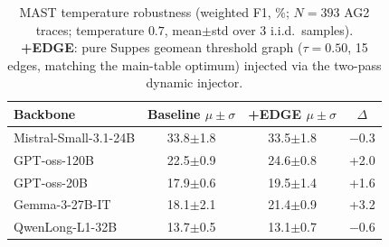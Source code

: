 %
%
%

\begin{table}[!tbp]
\centering \footnotesize
\begin{tabular}{l cc c}
\toprule
\textbf{Backbone} & Baseline $\mu\pm\sigma$ & +EDGE $\mu\pm\sigma$ & $\Delta$ \\
\midrule
Mistral-Small-3.1-24B & 33.8$\pm$1.8 & 33.5$\pm$1.8 & $-$0.3 \\
GPT-oss-120B          & 22.5$\pm$0.9 & 24.6$\pm$0.8 & +2.0 \\
GPT-oss-20B           & 17.9$\pm$0.6 & 19.5$\pm$1.4 & +1.6 \\
Gemma-3-27B-IT        & 18.1$\pm$2.1 & 21.4$\pm$0.9 & +3.2 \\
QwenLong-L1-32B       & 13.7$\pm$0.5 & 13.1$\pm$0.7 & $-$0.6 \\
\bottomrule
\end{tabular}
\caption{%
  MAST temperature robustness (weighted F1, \%; $N{=}393$ AG2 traces;
  temperature $0.7$, mean$\pm$std over 3 i.i.d.\ samples).
  \textbf{+EDGE}: pure Suppes geomean threshold graph
  ($\tau{=}0.50$, 15 edges, matching the main-table optimum) injected
  via the two-pass dynamic injector.%
}
\label{tab:r3_mast_temperature}
\end{table}
